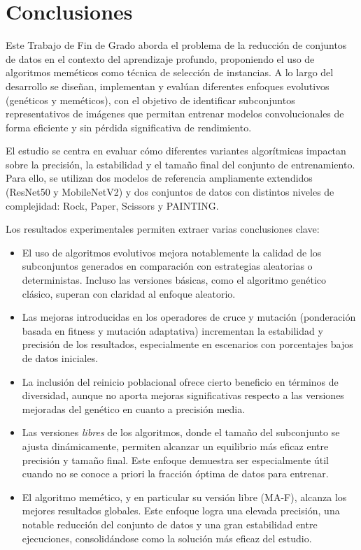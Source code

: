 
\chapter{Conclusiones}\label{ch:conclusiones}
Este Trabajo de Fin de Grado aborda el problema de la reducción de conjuntos de datos en el contexto del aprendizaje profundo,
proponiendo el uso de algoritmos meméticos como técnica de selección de instancias.
A lo largo del desarrollo se diseñan, implementan y evalúan diferentes enfoques evolutivos (genéticos y meméticos),
con el objetivo de identificar subconjuntos representativos de imágenes que permitan entrenar modelos convolucionales de forma eficiente y sin pérdida significativa de rendimiento.

El estudio se centra en evaluar cómo diferentes variantes algorítmicas impactan sobre la precisión, la estabilidad y el tamaño final del conjunto de entrenamiento.
Para ello, se utilizan dos modelos de referencia ampliamente extendidos (ResNet50 y MobileNetV2) y dos conjuntos de datos con distintos niveles de complejidad: Rock, Paper, Scissors y PAINTING.

Los resultados experimentales permiten extraer varias conclusiones clave:

\begin{itemize}
      \item El uso de algoritmos evolutivos mejora notablemente la calidad de los subconjuntos generados en comparación con estrategias aleatorias o deterministas.
            Incluso las versiones básicas, como el algoritmo genético clásico, superan con claridad al enfoque aleatorio.

      \item Las mejoras introducidas en los operadores de cruce y mutación (ponderación basada en fitness y mutación adaptativa)
            incrementan la estabilidad y precisión de los resultados, especialmente en escenarios con porcentajes bajos de datos iniciales.

      \item La inclusión del reinicio poblacional ofrece cierto beneficio en términos de diversidad,
            aunque no aporta mejoras significativas respecto a las versiones mejoradas del genético en cuanto a precisión media.

      \item Las versiones \textit{libres} de los algoritmos, donde el tamaño del subconjunto se ajusta dinámicamente,
            permiten alcanzar un equilibrio más eficaz entre precisión y tamaño final.
            Este enfoque demuestra ser especialmente útil cuando no se conoce a priori la fracción óptima de datos para entrenar.

      \item El algoritmo memético, y en particular su versión libre (MA-F), alcanza los mejores resultados globales.
            Este enfoque logra una elevada precisión, una notable reducción del conjunto de datos y una gran estabilidad entre ejecuciones,
            consolidándose como la solución más eficaz del estudio.
\end{itemize}


